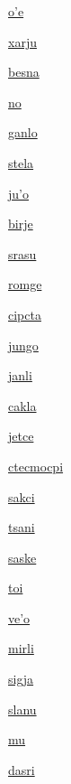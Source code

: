 {\hyperlink{val:ohe}{o'e}}{}{}{}

{\hyperlink{val:xarju}{xarju}}{}{}{}

{\hyperlink{val:besna}{besna}}{}{}{}

{\hyperlink{val:no}{no}}{}{}{}

{\hyperlink{val:ganlo}{ganlo}}{}{}{}

{\hyperlink{val:stela}{stela}}{}{}{}

{\hyperlink{val:juho}{ju'o}}{}{}{}

{\hyperlink{val:birje}{birje}}{}{}{}

{\hyperlink{val:srasu}{srasu}}{}{}{}

{\hyperlink{val:romge}{romge}}{}{}{}

{\hyperlink{val:cipcta}{cipcta}}{}{}{}

{\hyperlink{val:jungo}{jungo}}{}{}{}

{\hyperlink{val:janli}{janli}}{}{}{}

{\hyperlink{val:cakla}{cakla}}{}{}{}

{\hyperlink{val:jetce}{jetce}}{}{}{}

{\hyperlink{val:ctecmocpi}{ctecmocpi}}{}{}{}

{\hyperlink{val:sakci}{sakci}}{}{}{}

{\hyperlink{val:tsani}{tsani}}{}{}{}

{\hyperlink{val:saske}{saske}}{}{}{}

{\hyperlink{val:toi}{toi}}{}{}{}

{\hyperlink{val:veho}{ve'o}}{}{}{}

{\hyperlink{val:mirli}{mirli}}{}{}{}

{\hyperlink{val:sigja}{sigja}}{}{}{}

{\hyperlink{val:slanu}{slanu}}{}{}{}

{\hyperlink{val:mu}{mu}}{}{}{}

{\hyperlink{val:dasri}{dasri}}{}{}{}

